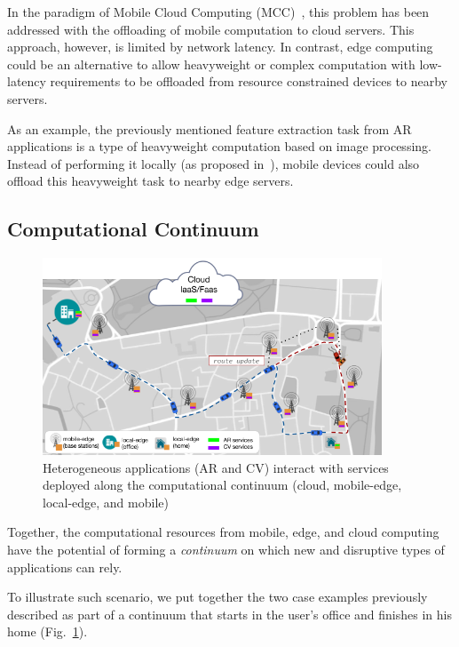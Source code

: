 In the paradigm of Mobile Cloud Computing (MCC)~\cite{Khan:14}, this problem has been addressed with the offloading of mobile computation to cloud servers. This approach, however, is limited by network latency. In contrast, edge computing could be an alternative to allow heavyweight or complex computation with low-latency requirements to be offloaded from resource constrained devices to nearby servers.


As an example, the previously mentioned feature extraction task from AR applications is a type of heavyweight computation based on image processing. Instead of performing it locally (as proposed in~\cite{Huang2012}), mobile devices could also offload this heavyweight task to nearby edge servers. 

\subsection{Computational Continuum}


\begin{figure}[tbp]
	\includegraphics[width=0.9\textwidth]{figs/continuum.png}
	\caption{Heterogeneous applications (AR and CV) interact with services deployed along the computational continuum (cloud, mobile-edge, local-edge, and mobile)}
	\label{fig:continuum}
\end{figure}

Together, the computational resources from mobile, edge, and cloud computing have the potential of forming a \textit{continuum} on which new and disruptive types of applications can rely. 

To illustrate such scenario, we put together the two case examples previously described as part of a continuum that starts in the user's office and finishes in his home (Fig.~\ref{fig:continuum}). 


